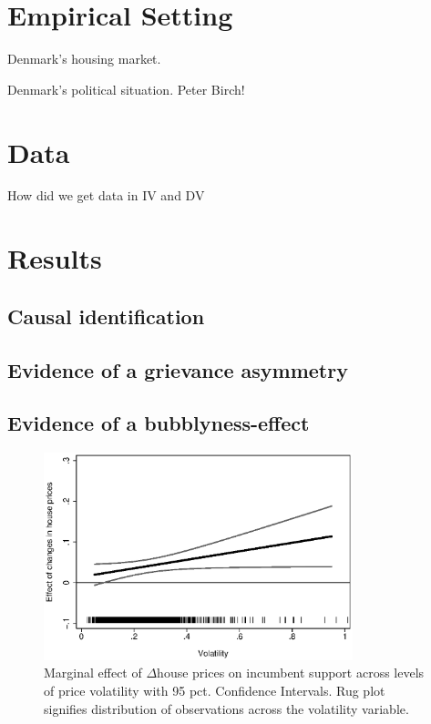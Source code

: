 \documentclass[12pt,a4paper]{article}
\begin{document}
\section{Empirical Setting}

Denmark's housing market.

Denmark's political situation.
Peter Birch!


\section{Data}

How did we get data in IV and DV

\section{Results}



\subsection{Causal identification}





\subsection{Evidence of a grievance asymmetry}



\subsection{Evidence of a  bubblyness-effect}



\begin{figure}
	\includegraphics[width=0.8\textwidth]{../figures/volatilityinteraction.eps}
	\centering
	\caption{Marginal effect of $\Delta$house prices on incumbent support across levels of price volatility with 95 pct. Confidence Intervals. Rug plot signifies distribution of observations across the volatility variable.}
\end{figure}
\end{document}
